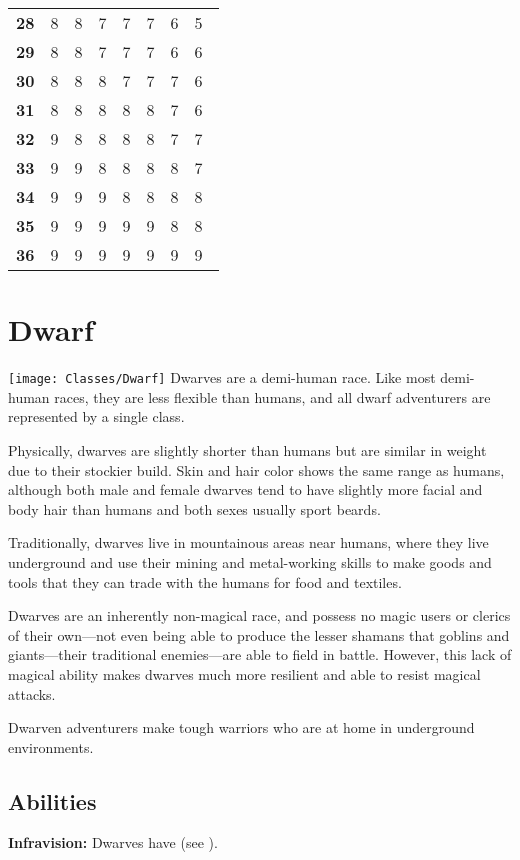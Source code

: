 \begin{multicols*}{2}
\begin {table}[H]
\begin{tabularx}{\columnwidth}{>{\bfseries}YYYYYYYY}
		28 & 8 & 8 & 7 & 7 & 7 & 6 & 5\\
		29 & 8 & 8 & 7 & 7 & 7 & 6 & 6\\
		30 & 8 & 8 & 8 & 7 & 7 & 7 & 6\\
		31 & 8 & 8 & 8 & 8 & 8 & 7 & 6\\
		32 & 9 & 8 & 8 & 8 & 8 & 7 & 7\\
		33 & 9 & 9 & 8 & 8 & 8 & 8 & 7\\
		34 & 9 & 9 & 9 & 8 & 8 & 8 & 8\\
		35 & 9 & 9 & 9 & 9 & 9 & 8 & 8\\
		36 & 9 & 9 & 9 & 9 & 9 & 9 & 9\
  \end {tabularx}
\end {table}

\section{Dwarf}\label{class:Dwarf}
\texttt{[image: Classes/Dwarf]}
Dwarves are a demi-human race. Like most demi-human races, they are less flexible than humans, and all dwarf adventurers are represented by a single class.

Physically, dwarves are slightly shorter than humans but are similar in weight due to their stockier build. Skin and hair color shows the same range as humans, although both male and female dwarves tend to have slightly more facial and body hair than humans and both sexes usually sport beards.

Traditionally, dwarves live in mountainous areas near humans, where they live underground and use their mining and metal-working skills to make goods and tools that they can trade with the humans for food and textiles.

Dwarves are an inherently non-magical race, and possess no magic users or clerics of their own—not even being able to produce the lesser shamans that goblins and giants—their traditional enemies—are able to field in battle. However, this lack of magical ability makes dwarves much more resilient and able to resist magical attacks.

Dwarven adventurers make tough warriors who are at home in underground environments.

\subsection{Abilities}
\textbf{Infravision:} Dwarves have  (see ).


\end{multicols*}
